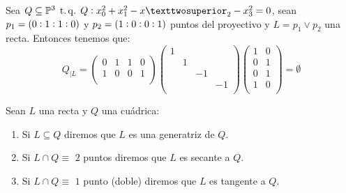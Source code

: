 \begin{example}
 Sea $Q\subseteq \Po^3 \tq Q:x^2_0 +x^2_1 -x²_2-x^2_3=0$, sean $p_1=\left( 0:1:1:0\right)$ y $p_2=\left( 
 1:0:0:1\right)$ puntos del proyectivo y $L=p_1 \vee p_2$ una recta. Entonces tenemos que:
 \[
  Q_{|L}=
  \begin{pmatrix}
   0 & 1 & 1 & 0\\
   1 & 0 & 0 & 1\\
  \end{pmatrix}
  \begin{pmatrix}
   1 & & &\\
   & 1 & &\\
   & & -1 &\\
   & & & -1\\
  \end{pmatrix}
  \begin{pmatrix}
   1 & 0\\
   0 & 1\\
   0 & 1\\
   1 & 0\\
  \end{pmatrix}
  =\emptyset
 \]
 \label{exampleLinQ}
\end{example}

\begin{defi}
 Sean $L$ una recta y $Q$ una cuádrica:
 \begin{enumerate}[(1)]
  \item Si $L\subseteq Q$ diremos que $L$ es una generatriz de $Q$.
  \item Si $L\cap Q \equiv$ $2$ puntos diremos que $L$ es secante a $Q$.
  \item Si $L\cap Q \equiv$ $1$ punto (doble) diremos que $L$ es tangente a $Q$.
 \end{enumerate}
\end{defi}

